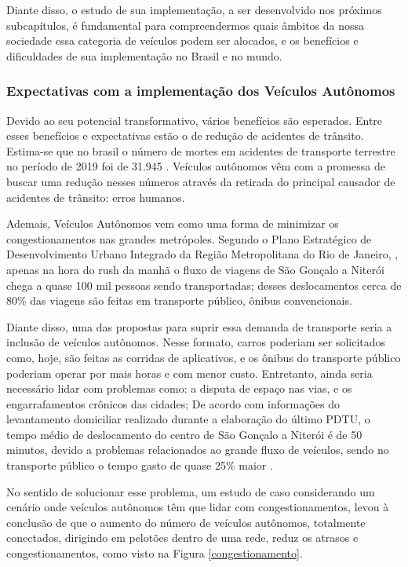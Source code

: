Diante disso, o estudo de sua implementação, a ser desenvolvido nos próximos subcapítulos, é fundamental para compreendermos quais âmbitos da nossa sociedade essa categoria de veículos podem ser alocados, e os benefícios e dificuldades de sua implementação no Brasil e no mundo.

 \subsubsection{Expectativas com a implementação dos Veículos Autônomos}
Devido ao seu potencial transformativo, vários benefícios são esperados. Entre esses benefícios e expectativas estão o de redução de acidentes de trânsito. Estima-se que no brasil o número de mortes em acidentes de transporte terrestre no período de 2019 foi de 31.945 \cite{Anexo_I_pnatrans}. Veículos autônomos vêm com a promessa de buscar uma redução nesses números através da retirada do principal causador de acidentes de trânsito: erros humanos. 

Ademais, Veículos Autônomos vem como uma forma de minimizar os congestionamentos nas grandes metrópoles. Segundo o  Plano Estratégico de Desenvolvimento Urbano Integrado da Região Metropolitana do Rio de Janeiro, \cite{rj_transito}, apenas na hora do rush da manhã o fluxo de viagens de São Gonçalo a Niterói chega a quase 100 mil pessoas sendo transportadas; desses deslocamentos cerca de 80\% das viagens são feitas em transporte público, ônibus convencionais. 

Diante disso, uma das propostas para suprir essa demanda de transporte seria a inclusão de veículos autônomos. Nesse formato, carros poderiam ser solicitados como, hoje, são feitas as corridas de aplicativos, e os ônibus do transporte público  poderiam operar por mais horas e com menor custo. 
Entretanto, ainda seria necessário lidar com problemas como: a disputa de espaço nas vias, e os engarrafamentos crônicos das cidades; De acordo com informações do levantamento domiciliar realizado durante a elaboração do último PDTU, o tempo médio de deslocamento do centro de São Gonçalo a Niterói é de 50 minutos, devido a problemas relacionados ao grande fluxo de veículos, sendo no transporte público o tempo gasto de quase 25\% maior \cite{rj_transito}.


No sentido de solucionar esse problema, um estudo de caso considerando um cenário onde veículos autônomos têm que lidar com congestionamentos, levou à conclusão de que o aumento do número de veículos autônomos, totalmente conectados, dirigindo em pelotões dentro de uma rede, reduz os atrasos e congestionamentos, como visto na Figura \ref{congestionamento}. 


